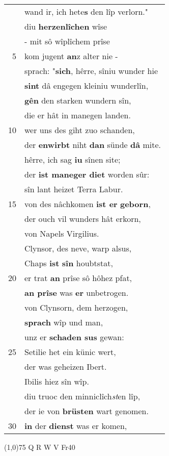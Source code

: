 \documentclass[8pt,a4paper,notitlepage]{article}
\begin{document}
\begin{table}[ht]
\begin{minipage}[t]{0.5\linewidth}
\begin{tabular}{rl}
 & wand ir, ich hete\textbf{s} den lîp verlorn."\\ 
 & diu \textbf{herzenlîchen} wîse\\ 
 & - mit sô wîplîchem prîse\\ 
5 & kom jugent \textbf{an}z alter nie -\\ 
 & sprach: "\textbf{sich}, hêrre, sîniu wunder hie\\ 
 & \textbf{sint} dâ engegen kleiniu wunderlîn,\\ 
 & \textbf{gên} den starken wundern sîn,\\ 
 & die er hât in manegen landen.\\ 
10 & wer uns des giht zuo schanden,\\ 
 & der \textbf{en}\textbf{wirbt} niht \textbf{dan} sünde \textbf{dâ} mite.\\ 
 & hêrre, ich sag \textbf{iu} sînen site;\\ 
 & der \textbf{ist maneger diet} worden sûr:\\ 
 & sîn lant heizet Terra Labur.\\ 
15 & von des nâchkomen \textbf{ist er} \textbf{geborn},\\ 
 & der ouch vil wunders hât erkorn,\\ 
 & von Napels Virgilius.\\ 
 & Clynsor, des neve, warp alsus,\\ 
 & Chaps \textbf{ist} \textbf{sîn} houbtstat,\\ 
20 & er trat \textbf{an} prîse sô hôhez pfat,\\ 
 & \textbf{an prîse} was \textbf{er} unbetrogen.\\ 
 & von Clynsorn, dem herzogen,\\ 
 & \textbf{sprach} wîp und man,\\ 
 & unz er \textbf{schaden sus} gewan:\\ 
25 & Setilie het ein künic wert,\\ 
 & der was geheizen Ibert.\\ 
 & Ibilis hiez sîn wîp.\\ 
 & diu truoc den minniclîch\textit{st}en lîp,\\ 
 & der ie von \textbf{brüsten} wart genomen.\\ 
30 & \textbf{in} der \textbf{dienst} was er komen,\\ 
\end{tabular}
\scriptsize
\line(1,0){75} \newline
Q R W V Fr40 \newline

\end{minipage}
\end{table}
\end{document}
